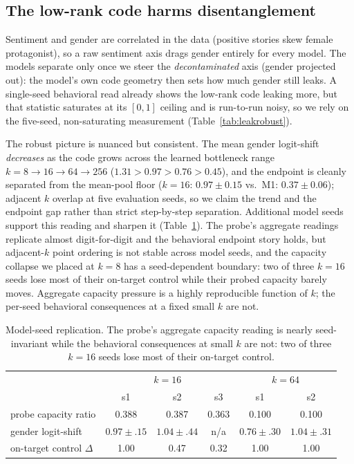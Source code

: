 \documentclass[11pt]{article}
\begin{document}
\subsection{The low-rank code harms disentanglement}
\label{sec:leak}
Sentiment and gender are correlated in the data (positive stories skew female
protagonist), so a raw sentiment axis drags gender entirely for every model. The
models separate only once we steer the \emph{decontaminated} axis (gender projected
out): the model's own code geometry then sets how much gender still leaks. A
single-seed behavioral read already shows the low-rank code leaking more, but that
statistic saturates at its $[0,1]$ ceiling and is run-to-run noisy, so we rely on the
five-seed, non-saturating measurement (Table~\ref{tab:leakrobust}).

The robust picture is nuanced but consistent. The mean gender logit-shift
\emph{decreases} as the code grows across the learned bottleneck range
$k{=}8\!\to\!16\!\to\!64\!\to\!256$ ($1.31\!>\!0.97\!>\!0.76\!>\!0.45$), and the
endpoint is cleanly separated from the mean-pool floor ($k{=}16$: $0.97\!\pm\!0.15$
vs.\ M1: $0.37\!\pm\!0.06$); adjacent $k$ overlap at five evaluation seeds, so we
claim the trend and the endpoint gap rather than strict step-by-step separation.
Additional model seeds support this reading and sharpen it
(Table~\ref{tab:seeds}). The probe's aggregate readings replicate almost
digit-for-digit and the behavioral endpoint story holds, but adjacent-$k$
point ordering is not stable across model seeds, and the capacity collapse we
placed at $k{=}8$ has a seed-dependent boundary: two of three $k{=}16$ seeds
lose most of their on-target control while their probed capacity barely
moves. Aggregate capacity pressure is a highly reproducible function of $k$;
the per-seed behavioral consequences at a fixed small $k$ are not.

\begin{table}[h]\centering\small
\begin{tabular}{l ccc cc}
& \multicolumn{3}{c}{$k{=}16$} & \multicolumn{2}{c}{$k{=}64$} \\
& s1 & s2 & s3 & s1 & s2 \\
\hline
probe capacity ratio       & 0.388 & 0.387 & 0.363 & 0.100 & 0.100 \\
gender logit-shift         & $0.97\!\pm\!.15$ & $1.04\!\pm\!.44$ & n/a & $0.76\!\pm\!.30$ & $1.04\!\pm\!.31$ \\
on-target control $\Delta$ & 1.00 & 0.47 & 0.32 & 1.00 & 1.00 \\
\end{tabular}
\caption{Model-seed replication. The probe's aggregate capacity reading is
nearly seed-invariant while the behavioral consequences at small $k$ are not:
two of three $k{=}16$ seeds lose most of their on-target control.}
\label{tab:seeds}
\end{table}
\end{document}
